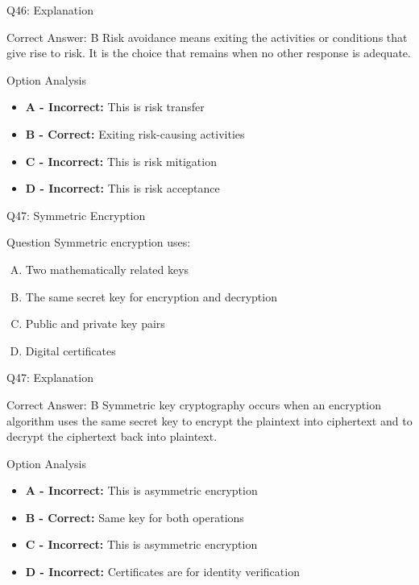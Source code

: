 \documentclass{beamer}
\begin{document}
	\begin{frame}{Q46: Explanation}
		\begin{block}{Correct Answer: B}
			Risk avoidance means exiting the activities or conditions that give rise to risk. It is the choice that remains when no other response is adequate.
		\end{block}
		\begin{block}{Option Analysis}
			\begin{itemize}
				\item \textbf{A - Incorrect:} This is risk transfer
				\item \textbf{B - Correct:} Exiting risk-causing activities
				\item \textbf{C - Incorrect:} This is risk mitigation
				\item \textbf{D - Incorrect:} This is risk acceptance
			\end{itemize}
		\end{block}
	\end{frame}
	
	\begin{frame}{Q47: Symmetric Encryption}
		\begin{block}{Question}
			Symmetric encryption uses:
		\end{block}
		\begin{enumerate}[(A)]
			\item Two mathematically related keys
			\item The same secret key for encryption and decryption
			\item Public and private key pairs
			\item Digital certificates
		\end{enumerate}
	\end{frame}
	
	\begin{frame}{Q47: Explanation}
		\begin{block}{Correct Answer: B}
			Symmetric key cryptography occurs when an encryption algorithm uses the same secret key to encrypt the plaintext into ciphertext and to decrypt the ciphertext back into plaintext.
		\end{block}
		\begin{block}{Option Analysis}
			\begin{itemize}
				\item \textbf{A - Incorrect:} This is asymmetric encryption
				\item \textbf{B - Correct:} Same key for both operations
				\item \textbf{C - Incorrect:} This is asymmetric encryption
				\item \textbf{D - Incorrect:} Certificates are for identity verification
			\end{itemize}
		\end{block}
	\end{frame}
	
\end{document}
